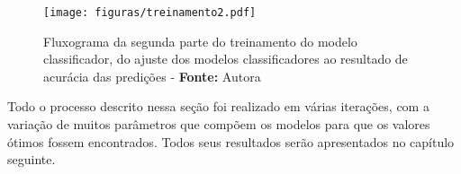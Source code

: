 \begin{figure}[H]
 \centering
  \texttt{[image: figuras/treinamento2.pdf]}
  \caption{Fluxograma da segunda parte do treinamento do modelo classificador, do ajuste dos modelos classificadores ao resultado de acurácia das predições - \textbf{Fonte:} Autora}
  \label{fig:flowtreinamento2}
\end{figure}

Todo o processo descrito nessa seção foi realizado em várias iterações, com a variação de muitos parâmetros que compõem os modelos para que os valores ótimos fossem encontrados. Todos seus resultados serão apresentados no capítulo seguinte.







